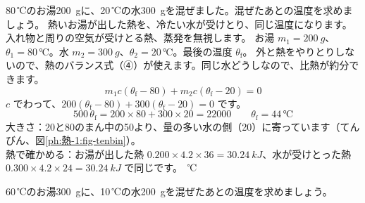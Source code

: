 \label{ph:熱-1:ex4}
\begin{phreidai}[お湯と水を混ぜる]
80\,℃のお湯\qty{200}{g}に、20\,℃の水\qty{300}{g}を混ぜました。混ぜたあとの温度を求めましょう。
\phbamen
熱いお湯が出した熱を、冷たい水が受けとり、同じ温度になります。
\phmushi
入れ物と周りの空気が受けとる熱、蒸発を無視します。
\phzu
お湯 $m_1=\qty{200}{g}$、$\theta_1=80\,℃$。水 $m_2=\qty{300}{g}$、$\theta_2=20\,℃$。最後の温度 $\theta_{\mathrm f}$。
\phriyu
外と熱をやりとりしないので、熱のバランス式（④）が使えます。同じ水どうしなので、比熱が約分できます。
\phtateru
\[m_1c(\theta_{\mathrm f}-80)+m_2c(\theta_{\mathrm f}-20)=0\]
\phtoku
$c$ でわって、$200(\theta_{\mathrm f}-80)+300(\theta_{\mathrm f}-20)=0$ です。
\[500\,\theta_{\mathrm f}=200\times80+300\times20=\num{22000}\qquad \theta_{\mathrm f}=44\,℃\]
\phtashikame
大きさ：20と80のまん中の50より、量の多い水の側（20）に寄っています（てんびん、図\ref{ph:熱-1:fig-tenbin}）。\\
熱で確かめる：お湯が出した熱 $0.200\times4.2\times36=\qty{30.24}{kJ}$、水が受けとった熱 $0.300\times4.2\times24=\qty{30.24}{kJ}$ で同じです。
\,℃
\end{phreidai}
\begin{jibun}
60\,℃のお湯\qty{300}{g}に、10\,℃の水\qty{200}{g}を混ぜたあとの温度を求めましょう。
\end{jibun}

